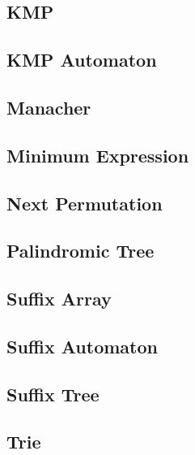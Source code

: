 \subsection{KMP}
\raggedbottom
\hrulefill
\subsection{KMP Automaton}
\raggedbottom
\hrulefill
\subsection{Manacher}
\raggedbottom
\hrulefill
\subsection{Minimum Expression}
\raggedbottom
\hrulefill
\subsection{Next Permutation}
\raggedbottom
\hrulefill
\subsection{Palindromic Tree}
\raggedbottom
\hrulefill
\subsection{Suffix Array}
\raggedbottom
\hrulefill
\subsection{Suffix Automaton}
\raggedbottom
\hrulefill
\subsection{Suffix Tree}
\raggedbottom
\hrulefill
\subsection{Trie}
\raggedbottom
\hrulefill
